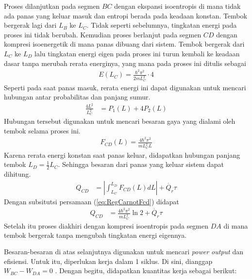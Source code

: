 \par Proses dilanjutkan pada segmen \(BC\) dengan ekspansi isoentropis di mana tidak ada panas yang keluar masuk dan entropi berada pada keadaan konstan. Tembok bergerak lagi dari \(L_B\) ke \(L_C\). Tidak seperti sebelumnya, tingkatan energi pada proses ini tidak berubah. Kemudian proses berlanjut pada segmen \(CD\) dengan kompresi isoenergetik di mana panas dibuang dari sistem. Tembok bergerak dari \(L_C\) ke \(L_D\) lalu tingkatan energi eigen pada proses ini turun kembali ke keadaan dasar tanpa merubah rerata energinya, yang mana pada proses ini ditulis sebagai
\begin{align}
    E(L_C) = \frac{\hbar^2\pi^2}{2mL_C^2} \cdot 4
\end{align}
Seperti pada saat panas masuk, rerata energi ini dapat digunakan untuk mencari hubungan antar probabilitas dan panjang sumur.
\begin{align}
    \frac{4L^2}{L_C^2} &= P_1(L) + 4P_2(L)
\end{align}
Hubungan tersebut digunakan untuk mencari besaran gaya yang dialami oleh tembok selama proses ini.
\begin{align}
    F_{CD}(L) = \frac{4\hbar^2\pi^2}{mL_C^2 L} \label{eq:RegCarnotFcd}
\end{align}
Karena rerata energi konstan saat panas keluar, didapatkan hubungan panjang tembok \(L_D = \frac{1}{2}L_C\). Sehingga besaran dari panas yang keluar sistem dapat dihitung. 
\begin{align}
    Q_{CD} &= \left| \int_{L_C}^{L_D} F_{CD}(L)dL \right| + \dot{Q_r}\tau
\end{align}
Dengan subsitutsi persamaan (\ref{eq:RegCarnotFcd}) didapat
\begin{align}
    Q_{CD} &= \frac{4\hbar^2\pi^2}{mL_C^2}\ln{2} + \dot{Q_r}\tau
\end{align}
Setelah itu proses diakhiri dengan kompresi isoentropis pada segmen \(DA\) di mana tembok bergerak tanpa mengubah tingkatan energi eigennya. 
\par Besaran-besaran di atas selanjutnya digunakan untuk mencari \textit{power output} dan efisiensi. Untuk itu, diperlukan kerja dalam 1 siklus. Di sini, dianggap \(W_{BC}-W_{DA}=0\) \cite{LibreTexts2021Carnot}. Dengan begitu, didapatkan kuantitas kerja sebagai berikut:
